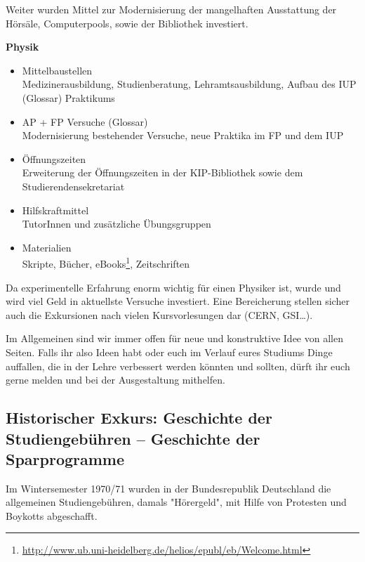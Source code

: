 Weiter wurden Mittel zur Modernisierung der mangelhaften Ausstattung der Hörsäle,
Computerpools, sowie der Bibliothek investiert.

\vspace{5mm}
\textbf{Physik}
\begin{itemize}
\item {Mittelbaustellen}\\Medizinerausbildung, Studienberatung, Lehramtsausbildung, Aufbau des IUP (Glossar) Praktikums
\item {AP + FP Versuche (Glossar)}\\Modernisierung bestehender Versuche, neue
Praktika im FP und dem IUP
\item {Öffnungszeiten}\\Erweiterung der Öffnungszeiten in der \gls{KIP}-Bibliothek sowie dem Studierendensekretariat
\item {Hilfskraftmittel}\\ TutorInnen und zusätzliche Übungsgruppen
\item {Materialien}\\Skripte, Bücher, eBooks\footnote{\url{http://www.ub.uni-heidelberg.de/helios/epubl/eb/Welcome.html}}, Zeitschriften
\end{itemize}

Da experimentelle Erfahrung enorm wichtig für einen Physiker ist, wurde und
wird viel Geld in aktuellste Versuche investiert. Eine Bereicherung stellen
sicher auch die Exkursionen nach vielen Kursvorlesungen dar (CERN, GSI\dots).

Im Allgemeinen sind wir immer offen für neue und konstruktive Idee von allen
Seiten. Falls ihr also Ideen habt oder euch im Verlauf eures Studiums Dinge
auffallen, die in der Lehre verbessert werden könnten und sollten, dürft ihr
euch gerne melden und bei der Ausgestaltung mithelfen.


\iffalse
\subsection*{Historischer Exkurs: Geschichte der Studiengebühren -- Geschichte der Sparprogramme}

Im Wintersemester 1970/71 wurden in der Bundesrepublik Deutschland die
allgemeinen Studiengebühren, damals "Hörergeld", mit Hilfe von Protesten und
Boykotts abgeschafft.

